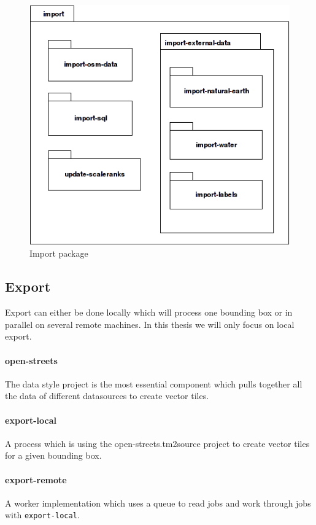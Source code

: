 \begin{figure}[h]
  \includegraphics[scale=0.6]{images/import_all_package_diagram.png}
  \caption{Import package}
\end{figure}


\newpage
\subsection{Export}
Export can either be done locally which will process one bounding box or in parallel on several
remote machines. In this thesis we will only focus on local export.


\paragraph{open-streets}
The data style project is the most essential component which pulls together all the
data of different datasources to create vector tiles. 

\paragraph{export-local}
A process which is using the open-streets.tm2source project to create vector tiles for a
given bounding box.

\paragraph{export-remote}
A worker implementation which uses a queue to read jobs and work through jobs with
\texttt{export-local}.

